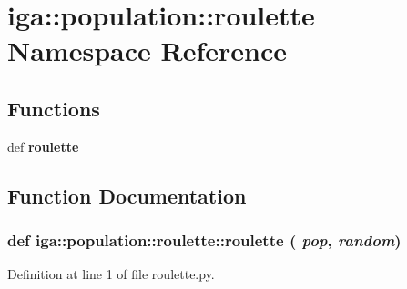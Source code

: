 \section{iga::population::roulette Namespace Reference}
\label{namespaceiga_1_1population_1_1roulette}


\subsection*{Functions}
\begin{CompactItemize}
\item 
def {\bf roulette}
\end{CompactItemize}


\subsection{Function Documentation}
\subsubsection{\setlength{\rightskip}{0pt plus 5cm}def iga::population::roulette::roulette ( {\em pop},  {\em random})}\label{namespaceiga_1_1population_1_1roulette_134f2148b37eaa565f468989e3ba7606}




Definition at line 1 of file roulette.py.